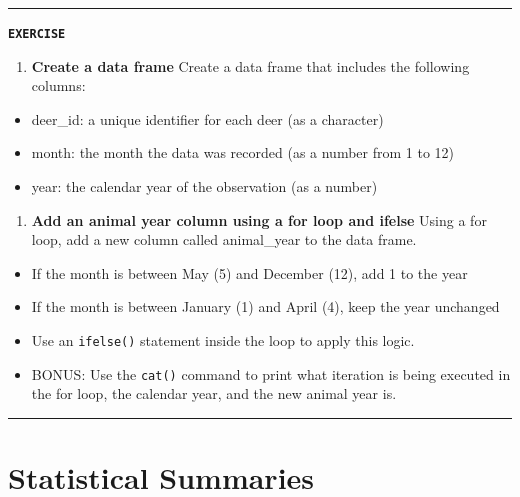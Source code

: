 \documentclass[
]{book}
\providecommand{\tightlist}{%
  \setlength{\itemsep}{0pt}\setlength{\parskip}{0pt}}
\begin{document}
\begin{center}\rule{0.5\linewidth}{0.5pt}\end{center}

\textbf{\texttt{EXERCISE}}

\begin{enumerate}
\def\labelenumi{\arabic{enumi}.}
\tightlist
\item
  \textbf{Create a data frame}
  Create a data frame that includes the following columns:
\end{enumerate}

\begin{itemize}
\tightlist
\item
  deer\_id: a unique identifier for each deer (as a character)
\item
  month: the month the data was recorded (as a number from 1 to 12)
\item
  year: the calendar year of the observation (as a number)
\end{itemize}

\begin{enumerate}
\def\labelenumi{\arabic{enumi}.}
\setcounter{enumi}{1}
\tightlist
\item
  \textbf{Add an animal year column using a for loop and ifelse}
  Using a for loop, add a new column called animal\_year to the data frame.
\end{enumerate}

\begin{itemize}
\tightlist
\item
  If the month is between May (5) and December (12), add 1 to the year
\item
  If the month is between January (1) and April (4), keep the year unchanged
\item
  Use an \texttt{ifelse()} statement inside the loop to apply this logic.
\item
  BONUS: Use the \texttt{cat()} command to print what iteration is being executed in the for loop, the calendar year, and the new animal year is.
\end{itemize}

\begin{center}\rule{0.5\linewidth}{0.5pt}\end{center}

\chapter{Statistical Summaries}\label{statistical-summaries}
\end{document}
